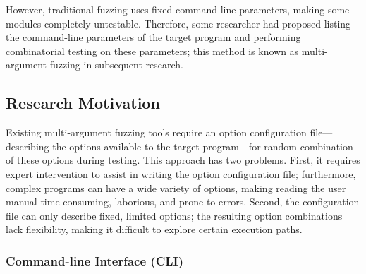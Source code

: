 However, traditional fuzzing uses fixed command-line parameters, making some modules completely untestable. Therefore, some researcher \cite{wu2020sq} had proposed listing the command-line parameters of the target program and performing combinatorial testing on these parameters; this method is known as multi-argument fuzzing in subsequent research.

\subsection{Research Motivation} %

Existing multi-argument fuzzing tools require an option configuration file—describing the options available to the target program—for random combination of these options during testing. This approach has two problems. First, it requires expert intervention to assist in writing the option configuration file; furthermore, complex programs can have a wide variety of options, making reading the user manual time-consuming, laborious, and prone to errors. Second, the configuration file can only describe fixed, limited options; the resulting option combinations lack flexibility, making it difficult to explore certain execution paths.

\subsubsection{Command-line Interface (CLI)} %

